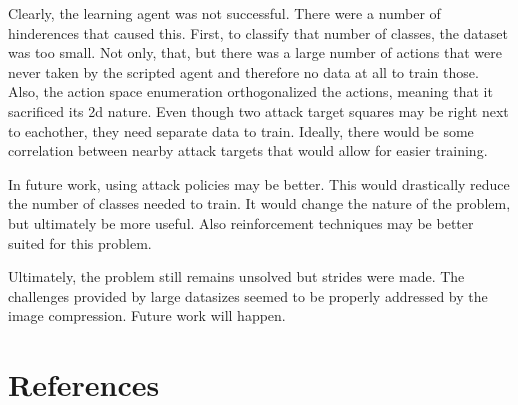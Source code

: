 \documentclass{amsart}
\theoremstyle{definition}
\begin{document}

Clearly, the learning agent was not successful.
There were a number of hinderences that caused this.
First, to classify that number of classes, the dataset was too small.
Not only, that, but there was a large number of actions that were never taken by the scripted agent and therefore no data at all to train those.
Also, the action space enumeration orthogonalized the actions, meaning that it sacrificed its 2d nature.
Even though two attack target squares may be right next to eachother, they need separate data to train.
Ideally, there would be some correlation between nearby attack targets that would allow for easier training.

In future work, using attack policies may be better.
This would drastically reduce the number of classes needed to train.
It would change the nature  of the problem, but ultimately be more useful.
Also reinforcement techniques may be better suited for this problem.

Ultimately, the problem still remains unsolved but strides were made.
The challenges provided by large datasizes seemed to be properly addressed by the image compression.
Future work will happen.









\section{References}







\end{document}
